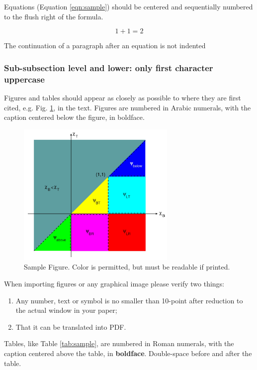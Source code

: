 \documentclass{mc2015}
\begin{document}
Equations (Equation \ref{eqn:sample}) should be centered and sequentially numbered to the flush right of the formula.

\begin{equation}
  1+1=2
  \label{eqn:sample}
\end{equation}

\noindent
The continuation of a paragraph after an equation is not indented

\subsubsection{Sub-subsection level and lower: only first character uppercase}

Figures and tables should appear as closely as possible to where they are first cited, e.g. 
Fig. \ref{fig:sample}, in the text.  Figures are numbered in Arabic numerals, with the caption centered below the figure, in boldface. 

\begin{figure}[H]
  \centering
  \includegraphics[width=3in]{figure.png}
  \caption{Sample Figure. Color is permitted, but must be readable if printed.}
  \label{fig:sample}
\end{figure}

When importing figures or any graphical image please verify two things:
\begin{enumerate}
\item Any number, text or symbol is no smaller than 10-point after reduction to the actual window in your paper;
\item That it can be translated into PDF.
\end{enumerate}

Tables, like Table \ref{tab:sample}, are numbered in Roman numerals, with the caption centered above the table, in \textbf{boldface}.  
Double-space before and after the table.
\end{document}

